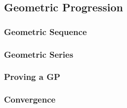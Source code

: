 \documentclass[../main]{subfiles}
\begin{document}
\subsection{Geometric Progression}
	
	\subsubsection{Geometric Sequence}
	\subsubsection{Geometric Series}
	\subsubsection{Proving a GP}
	\subsubsection{Convergence}
\end{document}
